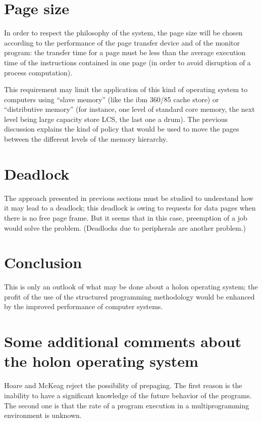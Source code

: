 \documentclass[openany,nobib]{tufte-book}
\begin{document}
\section{Page size}

In order to respect the philosophy of the system, the page size will be chosen
according to the performance of the page transfer device and of the monitor
program: the transfer time for a page must be less than the average execution
time of the instructions contained in one page (in order to avoid disruption of
a process computation).

This requirement may limit the application of this kind of operating system to
computers using ``slave memory'' (like the {\sc ibm} 360/85 cache store) or
``distributive memory'' (for instance, one level of standard core memory, the
next level being large capacity store LCS, the last one a drum). The previous
discussion explains the kind of policy that would be used to move the pages
between the different levels of the memory hierarchy.

\section{Deadlock}

The approach presented in previous sections must be studied to understand how
it may lead to a deadlock; this deadlock is owing to requests for data pages
when there is no free page frame. But it seems that in this case, preemption of
a job would solve the problem. (Deadlocks due to peripherals are another
problem.)

\section{Conclusion}

This is only an outlook of what may be done about a holon operating system; the
profit of the use of the structured programming methodology would be enhanced
by the improved performance of computer systems.

\section{Some additional comments about the holon operating system}

Hoare and McKeag reject the possibility of prepaging.\autocite{hoare1972survey}
The first reason is the inability to have a significant knowledge of the future
behavior of the programs. The second one is that the rate of a program
execution in a multiprogramming environment is unknown.
\end{document}
